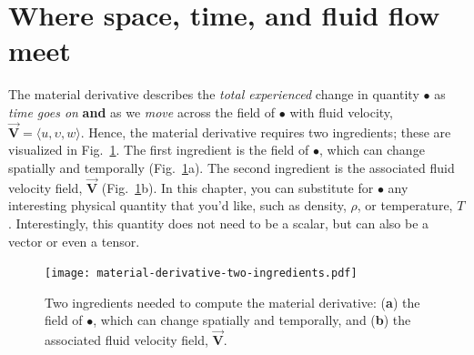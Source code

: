 \section{Where space, time, and fluid flow meet}

The material derivative describes the \textit{total experienced} change in quantity $\bullet$ as \textit{time goes on} \textbf{and} as we \textit{move} across the field of $\bullet$ with fluid velocity, $\vec{\bm{V}} = \langle u, \upsilon, w \rangle$. Hence, the material derivative requires two ingredients; these are visualized in Fig.~\ref{fig:material-derivative-two-ingredients}. The first ingredient is the field of $\bullet$, which can change spatially and temporally (Fig.~\ref{fig:material-derivative-two-ingredients}a). The second ingredient is the associated fluid velocity field, $\vec{\bm{V}}$ (Fig.~\ref{fig:material-derivative-two-ingredients}b). In this chapter, you can substitute for $\bullet$ any interesting physical quantity that you'd like, such as density, $\rho$, or temperature, $T$. Interestingly, this quantity does not need to be a scalar, but can also be a vector or even a tensor.
\begin{figure}[H]
\centering\texttt{[image: material-derivative-two-ingredients.pdf]}
\caption{Two ingredients needed to compute the material derivative: (\textbf{a}) the field of $\bullet$, which can change spatially and temporally, and (\textbf{b}) the associated fluid velocity field, $\vec{\bm{V}}$.}
\label{fig:material-derivative-two-ingredients}
\end{figure}


